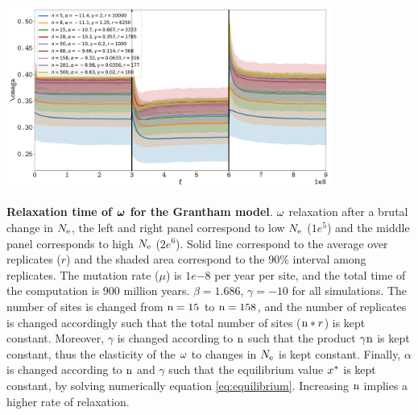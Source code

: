 \documentclass{article}
\begin{document}
\begin{center}
	\includegraphics[width=0.8\textwidth] {artworks/Relaxation-Stability-Grantham-Alpha-Gamma.pdf}
\end{center}
\textbf{Relaxation time of $\bm{\omega}$ for the Grantham model}.
$\omega$ relaxation after a brutal change in $N_{\mathrm{e}}$, the left and right panel correspond to low $N_{\mathrm{e}}$ ($1e^{5}$) and the middle panel corresponds to high $N_{\mathrm{e}}$ ($2e^{6}$). 
Solid line correspond to the average over replicates ($r$) and the shaded area correspond to the $90\%$ interval among replicates. 
The mutation rate ($\mu$) is $1e{-8}$ per year per site, and the total time of the computation is $900$ million years.
$\beta=1.686$, $\gamma=-10$ for all simulations. The number of sites is changed from $\text{n}=15$ to $\text{n}=158$, and the number of replicates is changed accordingly such that the total number of sites ($\text{n}*r$) is kept constant.
Moreover, $\gamma$ is changed according to $\text{n}$ such that the product $\gamma\text{n}$ is kept constant, thus the  elasticity of the $\omega$ to changes in $N_{\mathrm{e}}$ is kept constant.
Finally, $\alpha$ is changed according to $\text{n}$ and $\gamma$ such that the equilibrium value $x^{*}$ is kept constant, by solving numerically equation \ref{eq:equilibrium}.
Increasing $\text{n}$ implies a higher rate of relaxation.




\end{document}
